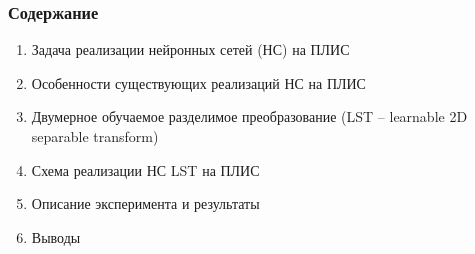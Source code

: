\begin{frame}
\frametitle{Содержание}

\begin{enumerate}
    \item Задача реализации нейронных сетей (НС) на ПЛИС
    \item Особенности существующих реализаций НС на ПЛИС
    \item Двумерное обучаемое разделимое преобразование (LST – learnable 2D separable transform)
    \item Схема реализации НС LST на ПЛИС
    \item Описание эксперимента и результаты
    \item Выводы
\end{enumerate}

\end{frame}
